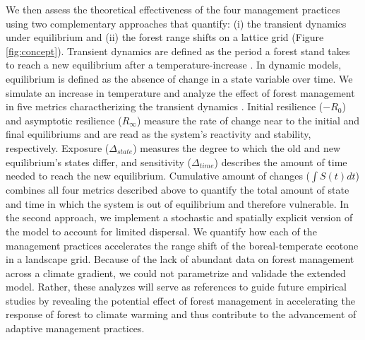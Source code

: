 We then assess the theoretical effectiveness of the four management
practices using two complementary approaches that quantify: (i) the
transient dynamics under equilibrium and (ii) the forest range shifts on
a lattice grid (Figure \ref{fig:concept}). Transient dynamics are
defined as the period a forest stand takes to reach a new equilibrium
after a temperature-increase \citep{Hastings2004}. In dynamic models,
equilibrium is defined as the absence of change in a state variable over
time. We simulate an increase in temperature and analyze the effect of
forest management in five metrics charactherizing the transient dynamics
\citep{Boulangeat2018}. Initial resilience (\(-R_0\)) and asymptotic
resilience (\(R_{\infty}\)) measure the rate of change near to the
initial and final equilibriums and are read as the system's reactivity
and stability, respectively. Exposure (\(\Delta_{state}\)) measures the
degree to which the old and new equilibrium's states differ, and
sensitivity (\(\Delta_{time}\)) describes the amount of time needed to
reach the new equilibrium. Cumulative amount of changes
(\(\int S(t)dt\)) combines all four metrics described above to quantify
the total amount of state and time in which the system is out of
equilibrium and therefore vulnerable. In the second approach, we
implement a stochastic and spatially explicit version of the model to
account for limited dispersal. We quantify how each of the management
practices accelerates the range shift of the boreal-temperate ecotone in
a landscape grid. Because of the lack of abundant data on forest
management across a climate gradient, we could not parametrize and
validade the extended model. Rather, these analyzes will serve as
references to guide future empirical studies by revealing the potential
effect of forest management in accelerating the response of forest to
climate warming and thus contribute to the advancement of adaptive
management practices.

